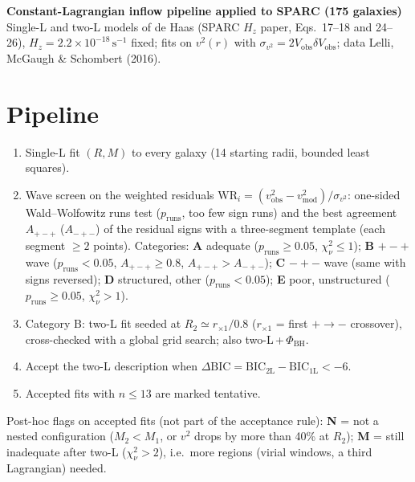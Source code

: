 \documentclass[9pt]{extarticle}
\begin{document}
\begin{center}{\Large\bfseries Constant-Lagrangian inflow pipeline applied to SPARC (175 galaxies)}\\[4pt]
{\small Single-L and two-L models of de Haas (SPARC $H_z$ paper, Eqs.\ 17--18 and 24--26), $H_z=2.2\times10^{-18}\,\mathrm{s^{-1}}$ fixed; fits on $v^2(r)$ with $\sigma_{v^2}=2V_\mathrm{obs}\delta V_\mathrm{obs}$; data Lelli, McGaugh \& Schombert (2016).}\end{center}
\section*{Pipeline}
\begin{enumerate}\itemsep0pt
\item Single-L fit $(R,M)$ to every galaxy (14 starting radii, bounded least squares).
\item Wave screen on the weighted residuals $\mathrm{WR}_i=(v^2_\mathrm{obs}-v^2_\mathrm{mod})/\sigma_{v^2}$: one-sided Wald--Wolfowitz runs test ($p_\mathrm{runs}$, too few sign runs) and the best agreement $A_{+-+}$ ($A_{-+-}$) of the residual signs with a three-segment template (each segment $\geq2$ points). Categories: \textbf{A} adequate ($p_\mathrm{runs}\ge0.05$, $\chi^2_\nu\le1$); \textbf{B} $+-+$ wave ($p_\mathrm{runs}<0.05$, $A_{+-+}\ge0.8$, $A_{+-+}>A_{-+-}$); \textbf{C} $-+-$ wave (same with signs reversed); \textbf{D} structured, other ($p_\mathrm{runs}<0.05$); \textbf{E} poor, unstructured ($p_\mathrm{runs}\ge0.05$, $\chi^2_\nu>1$).
\item Category B: two-L fit seeded at $R_2\simeq r_{\times1}/0.8$ ($r_{\times1}$ = first $+\to-$ crossover), cross-checked with a global grid search; also two-L\,+\,$\Phi_\mathrm{BH}$.
\item Accept the two-L description when $\Delta\mathrm{BIC}=\mathrm{BIC}_\mathrm{2L}-\mathrm{BIC}_\mathrm{1L}<-6$.
\item Accepted fits with $n\le13$ are marked tentative.
\end{enumerate}
Post-hoc flags on accepted fits (not part of the acceptance rule): \textbf{N} = not a nested configuration ($M_2<M_1$, or $v^2$ drops by more than 40\% at $R_2$); \textbf{M} = still inadequate after two-L ($\chi^2_\nu>2$), i.e.\ more regions (virial windows, a third Lagrangian) needed.
\end{document}
